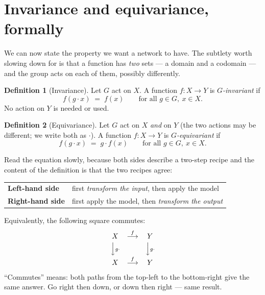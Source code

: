 \documentclass[11pt,a4paper]{report}
\theoremstyle{definition}
\newtheorem{definition}[definition]{Definition}
\theoremstyle{remark}
\begin{document}
\section{Invariance and equivariance, formally}
\label{sec:invariance-equivariance}

We can now state the property we want a network to have. The subtlety worth
slowing down for is that a function has \emph{two} sets --- a domain and a
codomain --- and the group acts on each of them, possibly differently.

\begin{definition}[Invariance]
\label{def:invariance-scratch}
Let $G$ act on $X$. A function $f:X\to Y$ is \emph{$G$-invariant} if
\[
f(g\cdot x) \;=\; f(x)
\qquad\text{for all } g\in G,\ x\in X .
\]
No action on $Y$ is needed or used.
\end{definition}

\begin{definition}[Equivariance]
\label{def:equivariance-scratch}
Let $G$ act on $X$ \emph{and} on $Y$ (the two actions may be different; we
write both as $\cdot$). A function $f:X\to Y$ is \emph{$G$-equivariant} if
\[
f(g\cdot x) \;=\; g\cdot f(x)
\qquad\text{for all } g\in G,\ x\in X .
\]
\end{definition}

Read the equation slowly, because both sides describe a two-step recipe and
the content of the definition is that the two recipes agree:

\begin{center}
\begin{tabular}{ll}
\textbf{Left-hand side} & first \emph{transform the input}, then apply the model \\
\textbf{Right-hand side} & first apply the model, then \emph{transform the output} \\
\end{tabular}
\end{center}

Equivalently, the following square commutes:
\[
\begin{array}{ccc}
X & \stackrel{f}{\longrightarrow} & Y\\[2pt]
\Big\downarrow{\scriptstyle g\cdot} & & \Big\downarrow{\scriptstyle g\cdot}\\[4pt]
X & \stackrel{f}{\longrightarrow} & Y
\end{array}
\]
``Commutes'' means: both paths from the top-left to the bottom-right give
the same answer. Go right then down, or down then right --- same result.
\end{document}
